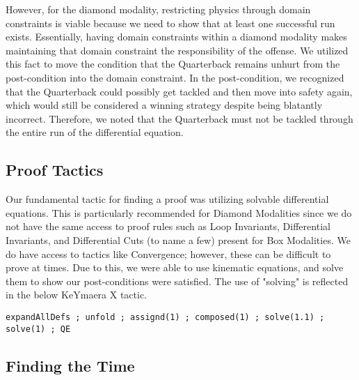 However, for the diamond modality, restricting physics through domain constraints is viable because we need to show that at least one successful run exists. Essentially, having domain constraints within a diamond modality makes maintaining that domain constraint the responsibility of the offense. We utilized this fact to move the condition that the Quarterback remains unhurt from the post-condition into the domain constraint. In the post-condition, we recognized that the Quarterback could possibly get tackled and then move into safety again, which would still be considered a winning strategy despite being blatantly incorrect. Therefore, we noted that the Quarterback must not be tackled through the entire run of the differential equation.

\subsection{Proof Tactics}

\quad Our fundamental tactic for finding a proof was utilizing solvable differential equations. This is particularly recommended for Diamond Modalities since we do not have the same access to proof rules such as Loop Invariants, Differential Invariants, and Differential Cuts (to name a few) present for Box Modalities. We do have access to tactics like Convergence; however, these can be difficult to prove at times. Due to this, we were able to use kinematic equations, and solve them to show our post-conditions were satisfied. The use of "solving" is reflected in the below KeYmaera X tactic. 

\begin{lstlisting}
expandAllDefs ; unfold ; assignd(1) ; composed(1) ; solve(1.1) ; solve(1) ; QE
\end{lstlisting}


\subsection{Finding the Time}

